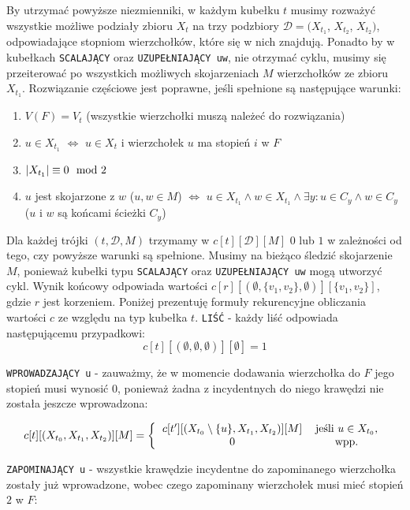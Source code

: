 \documentclass[12pt, oneside]{report}
\begin{document}
By utrzymać powyższe niezmienniki, w każdym kubełku $t$ musimy rozważyć wszystkie możliwe podziały zbioru $X_t$ na trzy podzbiory $\mathcal{D} = (X_{t_1}$, $X_{t_2}$, $X_{t_2})$, odpowiadające stopniom wierzchołków, które się w nich znajdują. Ponadto by w kubełkach \texttt{SCALAJĄCY} oraz \texttt{UZUPEŁNIAJĄCY uw}, nie otrzymać cyklu, musimy się przeiterować po wszystkich możliwych skojarzeniach $M$ wierzchołków ze zbioru $X_{t_1}$. Rozwiązanie częściowe jest poprawne, jeśli spełnione są następujące warunki:
\begin{enumerate}
\item $V(F) = V_t$ (wszystkie wierzchołki muszą należeć do rozwiązania)
\item $u \in X_{t_1}$ $\Leftrightarrow$ $u \in X_t$ i wierzchołek $u$ ma stopień $i$ w $F$
\item $\abs{X_{t_1}} \equiv 0 \mod 2$
\item $u$ jest skojarzone z $w$ (${u, w} \in M$) $\Leftrightarrow$ $u \in X_{t_1} \wedge w \in X_{t_1} \wedge \exists y: u \in C_y \wedge w \in C_y$ ($u$ i $w$ są końcami ścieżki $C_y$) 
\end{enumerate}  

Dla każdej trójki $(t, \mathcal{D}, M)$ trzymamy w $c[t][\mathcal{D}][M]$ $0$ lub $1$ w zależności od tego, czy powyższe warunki są spełnione. Musimy na bieżąco śledzić skojarzenie $M$, ponieważ kubełki typu \texttt{SCALAJĄCY} oraz \texttt{UZUPEŁNIAJĄCY uw} mogą utworzyć cykl. Wynik końcowy odpowiada wartości $c[r][(\emptyset, \{v_1, v_2\}, \emptyset)][\{v_1, v_2\}]$, gdzie $r$ jest korzeniem. Poniżej prezentuję formuły rekurencyjne obliczania wartości $c$ ze względu na typ kubełka $t$.
\newline\newline
\texttt{LIŚĆ} - każdy liść odpowiada następującemu przypadkowi:
$$c[t][(\emptyset, \emptyset, \emptyset)][\emptyset] = 1$$

\texttt{WPROWADZAJĄCY u} - zauważmy, że w momencie dodawania wierzchołka do $F$ jego stopień musi wynosić $0$, ponieważ żadna z incydentnych do niego krawędzi nie została jeszcze wprowadzona:

\[
c[t][(X_{t_0}, X_{t_1}, X_{t_2})][M] =  
\left \{
  \begin{tabular}{ccc}
  $c[t^{\prime}][(X_{t_0} \setminus \{u\}, X_{t_1}, X_{t_2})][M]$ & jeśli $u \in X_{t_0}$,\\
  $0$ & wpp.
  \end{tabular}
\right. 
\]

\texttt{ZAPOMINAJĄCY u} - wszystkie krawędzie incydentne do zapominanego wierzchołka zostały już wprowadzone, wobec czego zapominany wierzchołek musi mieć stopień $2$ w $F$:
\end{document}
